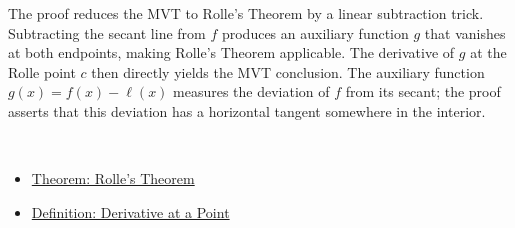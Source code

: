 \begin{remark*}
The proof reduces the MVT to Rolle's Theorem by a linear subtraction trick. Subtracting the secant line from $f$ produces an auxiliary function $g$ that vanishes at both endpoints, making Rolle's Theorem applicable. The derivative of $g$ at the Rolle point $c$ then directly yields the MVT conclusion. The auxiliary function $g(x) = f(x) - \ell(x)$ measures the deviation of $f$ from its secant; the proof asserts that this deviation has a horizontal tangent somewhere in the interior.
\end{remark*}

\begin{remark*}[Dependencies]~\\
\begin{itemize}
  \item \hyperref[thm:rolles-theorem]{Theorem: Rolle's Theorem}
  \item \hyperref[def:derivative-at-a-point]{Definition: Derivative at a Point}
\end{itemize}
\end{remark*}
